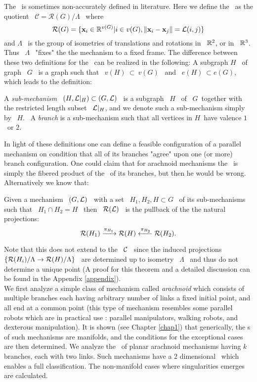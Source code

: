 The \cspace \ is sometimes non-accurately defined in literature.
Here we define the \cspace \ as the quotient \
$\mathcal{C}=\mathcal{R}(G)/\Lambda$ \ where
%
$$
\mathcal{R}(G)=\{\textbf{x}_i \in {\mathbb R}^{v(G)}|i\in v(G),
\|\textbf{x}_i-\textbf{x}_j\|=\mathcal{L}(i,j) \}
$$
%
and $\Lambda$ \ is the group of isometries of translations and
rotations in \ ${\mathbb R}^{2}$, or in \ ${\mathbb R}^{3}$. Thus \ $\Lambda$ \
"fixes" the the mechanism to a fixed frame. The difference between
these two definitions for the \cspace \ can be realized in the
following: A subgraph $H$ \ of graph \ $G$ \ is a graph such that
\ $v(H) \ \subset \ v(G)$ \ and \ $e(H) \ \subset e(G)$, which
leads to the definition:
\begin{defn}
A \emph{sub-mechanism} \ $(H,\mathcal{L}|_{H})\subset (G,\mathcal{L})$ \ is
a subgraph \ $H$ \ of \ $G$\ together with the restricted length
subset \ $\mathcal{L}|_{H}$, and we denote such a sub-mechanism simply by \
$H$. \ A \emph{branch} is a sub-mechanism such that all vertices
in $H$\ have valence $1$\ or $2$.
\end{defn}
In light of these definitions one can define a feasible
configuration of a parallel mechanism on condition that all of its
branches "agree" upon one (or more) branch configuration. One
could claim that for  arachnoid mechanisms the \cspace \ is simply
the fibered product of the \cspace \ of its branches, but then he
would be wrong. Alternatively we know that:
\begin{thm}
Given a mechanism \ $(G,\mathcal{L})$ \ with a set \ $H_{1},H_{2},H \subset
G$ \ of its sub-mechanisms such that \ $H_{1}\cap H_{2}=H$ \ then
\ $\mathcal{R}(\mathcal{L})$ \ is the pullback of the the natural projections:
%
$$
\mathcal{R}(H_{1}) \xrightarrow{\pi_{H_{1}}} \mathcal{R}(H) \xleftarrow{\pi_{H_{2}}}
\mathcal{R}(H_{2}).
$$
\end{thm}
Note that this does not extend to the \cspace \ $\mathcal{C}$ \ since the
induced projections \ $\{\mathcal{R}(H_{i})/\Lambda \rightarrow
\mathcal{R}(H)/\Lambda\}$ \ are determined up to isometry \ $\Lambda$ \ and
thus do not determine a unique point (A proof for this theorem and
a detailed discussion can be found in the Appendix \ref{appendix}).\\

We first analyze a simple class of mechanism called
\emph{arachnoid} which consists of multiple branches each having
arbitrary number of links a fixed initial point, and all end at a
common point (this type of mechanism resembles some parallel
robots which are in practical use \cite{LLL}: parallel
manipulators, walking robots, and dexterous manipulation). It is
shown (see Chapter \ref{chap1}) that generically, the \cspace s of
such mechanisms are manifolds, and the conditions for the
exceptional cases are then determined. We analyze the \cspace\ of
planar arachnoid mechanisms having $k$ branches, each with two
links. Such mechanisms have a $2$ dimensional \cspace \ which
enables a full classification. The non-manifold cases where
singularities emerges are calculated.


